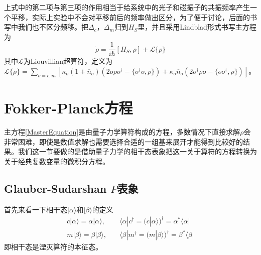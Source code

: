 上式中的第二项与第三项的作用相当于给系统中的光子和磁振子的共振频率产生一个平移，实际上实验中不会对平移前后的频率做出区分，为了便于讨论，后面的书写中我们也不区分频移。把$\Delta_c$，$\Delta_m$归到$H_S$里，并且采用Lindblad形式书写主方程为
\begin{equation}
\dot{\rho}=\frac{1}{i\hbar}[H_S,\rho]+\mathcal{L}\{\rho\}
\label{MasterEquation}
\end{equation}
其中$\mathcal{L}$为Liouvillian超算符，定义为$\mathcal{L}\{\rho\}=\sum\limits_{o=c,m}[\kappa_{o}(1 +\overline{n}_{o})(2o\rho o^{\dag}-\{o^{\dag}o,\rho\}) +\kappa_{o} \overline{n}_{o} (2o^{\dag}\rho o-\{oo^{\dag},\rho\})]$。

\section{Fokker-Planck方程}
主方程\eqref{MasterEquation}是由量子力学算符构成的方程，多数情况下直接求解$\rho$会非常困难，即使是数值求解也需要选择合适的一组基来展开才能得到比较好的结果。我们这一节要做的是借助量子力学的相干态表象把这一关于算符的方程转换为关于经典复数变量的微积分方程。

\subsection{Glauber-Sudarshan $P$表象}
首先来看一下相干态$|\alpha\rangle$和$|\beta\rangle$的定义
\begin{equation}
\begin{aligned}
c|\alpha\rangle=\alpha|\alpha\rangle,& \quad\langle\alpha| c^{\dagger}=(c|\alpha\rangle)^{\dagger}=\alpha^{*}\langle\alpha| \\
m|\beta\rangle=\beta|\beta\rangle,& \quad\langle\beta| m^{\dagger}=(m|\beta\rangle)^{\dagger}=\beta^{*}\langle\beta|
\end{aligned}
\end{equation}
即相干态是湮灭算符的本征态。

